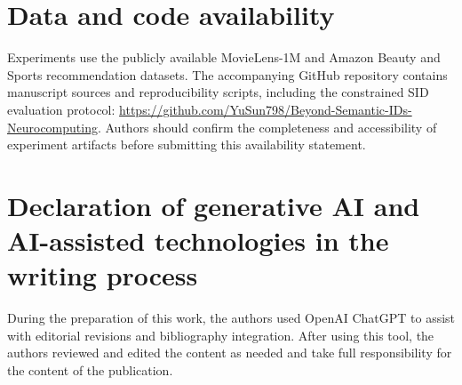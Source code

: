 \documentclass[preprint,12pt]{elsarticle}
\begin{document}


\clearpage
\section*{Data and code availability}
Experiments use the publicly available MovieLens-1M and Amazon Beauty and
Sports recommendation datasets. The accompanying GitHub repository contains
manuscript sources and reproducibility scripts, including the constrained SID
evaluation protocol:
\url{https://github.com/YuSun798/Beyond-Semantic-IDs-Neurocomputing}.
Authors should confirm the completeness and accessibility of experiment
artifacts before submitting this availability statement.

\section*{Declaration of generative AI and AI-assisted technologies in the writing process}
During the preparation of this work, the authors used OpenAI ChatGPT to
assist with editorial revisions and bibliography integration. After using
this tool, the authors reviewed and edited the content as needed and take
full responsibility for the content of the publication.


\end{document}
